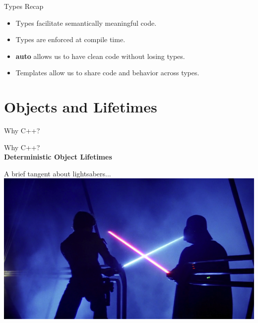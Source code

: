 \documentclass{beamer}
\begin{document}
	\begin{frame}{Types Recap}
		\begin{itemize}
			\item Types facilitate semantically meaningful code.
			\medskip
			\item Types are enforced at compile time.
			\medskip
			\item \textbf{auto} allows us to have clean code without losing types.
			\medskip
			\item Templates allow us to share code and behavior across types.
		\end{itemize}
	\end{frame}
	
	\section{Objects and Lifetimes}
	
	\begin{frame}
		\begin{center}
			Why C++?
		\end{center}
	\end{frame}
	
	\begin{frame}
		\begin{center}
			Why C++?\\
			\bigskip
			\textbf{Deterministic Object Lifetimes}
		\end{center}
	\end{frame}
	
	\begin{frame}
		\begin{center}
			A brief tangent about lightsabers...
			\includegraphics[width=\textwidth]{images/lightsabers}
		\end{center}
	\end{frame}
	
\end{document}
